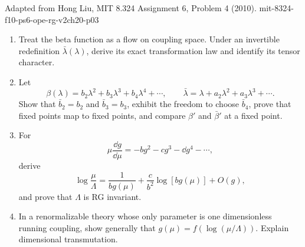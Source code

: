 \begin{enumerate}
  {Adapted from Hong Liu, MIT 8.324 Assignment 6, Problem 4 (2010).}
  {mit-8324-f10-ps6-ope-rg-v2ch20-p03}
  \begin{enumerate}
    \item[(a)] Treat the beta function as a flow on coupling space.  Under
      an invertible redefinition \(\bar\lambda(\lambda)\), derive its exact
      transformation law and identify its tensor character.
    \item[(b)] Let
      \[
        \beta(\lambda)=b_2\lambda^2+b_3\lambda^3+b_4\lambda^4+\cdots,
        \qquad
        \bar\lambda=\lambda+a_2\lambda^2+a_3\lambda^3+\cdots .
      \]
      Show that \(\bar b_2=b_2\) and \(\bar b_3=b_3\), exhibit the freedom
      to choose \(\bar b_4\), prove that fixed points map to fixed points,
      and compare \(\beta'\) and \(\bar\beta'\) at a fixed point.
    \item[(c)] For
      \[
        \mu\frac{\dd g}{\dd\mu}=-bg^2-cg^3-\dd g^4-\cdots ,
      \]
      derive
      \[
        \log\frac{\mu}{\Lambda}
          =\frac1{bg(\mu)}+\frac{c}{b^2}\log[bg(\mu)]+O(g),
      \]
      and prove that \(\Lambda\) is RG invariant.
    \item[(d)] In a renormalizable theory whose only parameter is one
      dimensionless running coupling, show generally that
      \(g(\mu)=f(\log(\mu/\Lambda))\).  Explain dimensional transmutation.
  \end{enumerate}


\end{enumerate}
